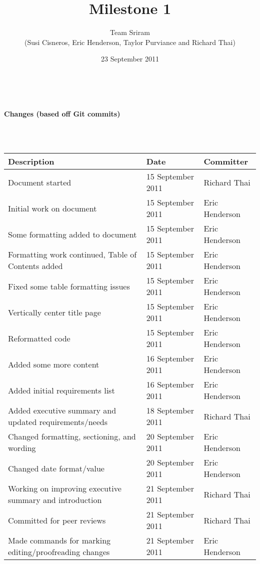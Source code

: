\documentclass{article}
\begin{document}
\setlength{\voffset}{3.5in}
\title{Milestone 1}
\author{Team Sriram\\
(Susi Cisneros, Eric Henderson, Taylor Purviance and Richard Thai)}
\date{23 September 2011}
\maketitle
\clearpage
\setlength{\voffset}{0pt}
\tableofcontents
\clearpage
~\\
\begin{Large}\textbf{Changes (based off Git commits)}\end{Large}\\
~\\
\begin{tabular}{ | p{3.75in} | p{1.5in} | p{1.25in} | }
\hline
\textbf{Description} & \textbf{Date} & \textbf{Committer}\\
\hline
\hline
Document started & 15 September 2011 & Richard Thai\\
\hline
Initial work on document & 15 September 2011 & Eric Henderson\\
\hline
Some formatting added to document & 15 September 2011 & Eric Henderson\\
\hline
Formatting work continued, Table of Contents added & 15 September 2011 & Eric Henderson\\
\hline
Fixed some table formatting issues & 15 September 2011 & Eric Henderson\\
\hline
Vertically center title page & 15 September 2011 & Eric Henderson\\
\hline
Reformatted code & 15 September 2011 & Eric Henderson\\
\hline
Added some more content & 16 September 2011 & Eric Henderson\\
\hline
Added initial requirements list & 16 September 2011 & Eric Henderson\\
\hline
Added executive summary and updated requirements/needs & 18 September 2011 & Richard Thai\\
\hline
Changed formatting, sectioning, and wording & 20 September 2011 & Eric Henderson\\
\hline
Changed date format/value & 20 September 2011 & Eric Henderson\\
\hline
Working on improving executive summary and introduction & 21 September 2011 & Richard Thai\\
\hline
Committed for peer reviews & 21 September 2011 & Richard Thai\\
\hline
Made commands for marking editing/proofreading changes & 21 September 2011 & Eric Henderson\\

\end{tabular}
\end{document}
